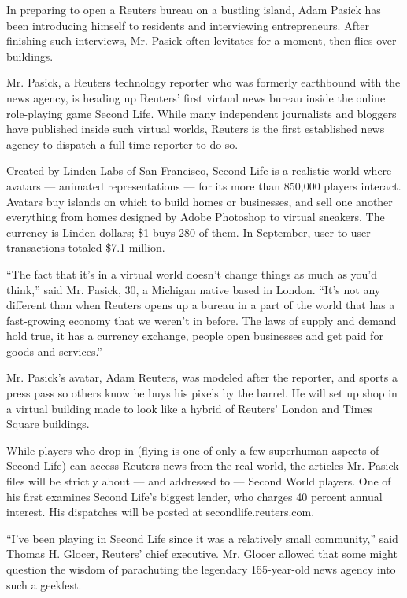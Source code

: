 In preparing to open a Reuters bureau on a bustling island, Adam Pasick
has been introducing himself to residents and interviewing
entrepreneurs. After finishing such interviews, Mr. Pasick often
levitates for a moment, then flies over buildings.

Mr. Pasick, a Reuters technology reporter who was formerly earthbound
with the news agency, is heading up Reuters' first virtual news bureau
inside the online role-playing game Second Life. While many independent
journalists and bloggers have published inside such virtual worlds,
Reuters is the first established news agency to dispatch a full-time
reporter to do so.

Created by Linden Labs of San Francisco, Second Life is a realistic
world where avatars --- animated representations --- for its more than
850,000 players interact. Avatars buy islands on which to build homes or
businesses, and sell one another everything from homes designed by Adobe
Photoshop to virtual sneakers. The currency is Linden dollars; \$1 buys
280 of them. In September, user-to-user transactions totaled \$7.1
million.

``The fact that it's in a virtual world doesn't change things as much as
you'd think,'' said Mr. Pasick, 30, a Michigan native based in London.
``It's not any different than when Reuters opens up a bureau in a part
of the world that has a fast-growing economy that we weren't in before.
The laws of supply and demand hold true, it has a currency exchange,
people open businesses and get paid for goods and services.''

Mr. Pasick's avatar, Adam Reuters, was modeled after the reporter, and
sports a press pass so others know he buys his pixels by the barrel. He
will set up shop in a virtual building made to look like a hybrid of
Reuters' London and Times Square buildings.

While players who drop in (flying is one of only a few superhuman
aspects of Second Life) can access Reuters news from the real world, the
articles Mr. Pasick files will be strictly about --- and addressed to
--- Second World players. One of his first examines Second Life's
biggest lender, who charges 40 percent annual interest. His dispatches
will be posted at secondlife.reuters.com.

``I've been playing in Second Life since it was a relatively small
community,'' said Thomas H. Glocer, Reuters' chief executive. Mr. Glocer
allowed that some might question the wisdom of parachuting the legendary
155-year-old news agency into such a geekfest.

